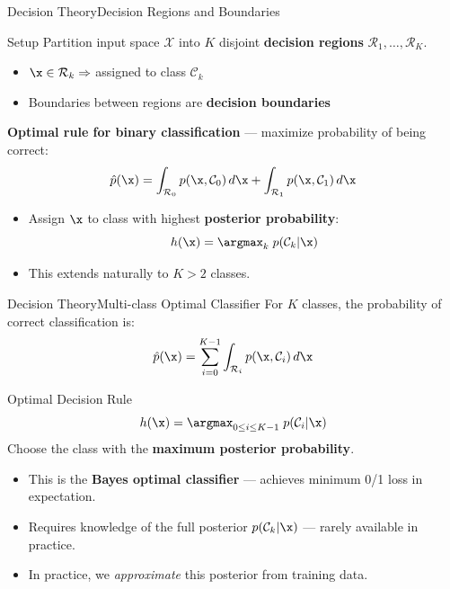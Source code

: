 \begin{frame}{Decision Theory}{Decision Regions and Boundaries}
  \begin{block}{Setup}
    Partition input space $\mathcal{X}$ into $K$ disjoint \textbf{decision regions} $\mathcal{R}_1, \ldots, \mathcal{R}_K$.
    \begin{itemize}
      \item $\x \in \mathcal{R}_k \Rightarrow$ assigned to class $\mathcal{C}_k$
      \item Boundaries between regions are \textbf{decision boundaries}
    \end{itemize}
  \end{block}

  \textbf{Optimal rule for binary classification} — maximize probability of being correct:
  \[
    \hat{p}(\x) = \int_{\mathcal{R}_0} p(\x,\mathcal{C}_0)\,d\x + \int_{\mathcal{R}_1} p(\x,\mathcal{C}_1)\,d\x
  \]
  
  \begin{itemize}
    \item Assign $\x$ to class with highest \textbf{posterior probability}:
    \[
      h(\x) = \argmax_{k} \; p(\mathcal{C}_k|\x)
    \]
    \item This extends naturally to $K > 2$ classes.
  \end{itemize}
\end{frame}

\begin{frame}{Decision Theory}{Multi-class Optimal Classifier}
  For $K$ classes, the probability of correct classification is:
  \[
    \hat{p}(\x) = \sum_{i=0}^{K-1} \int_{\mathcal{R}_i} p(\x, \mathcal{C}_i)\,d\x
  \]

  \begin{block}{Optimal Decision Rule}
    \[
      h(\x) = \argmax_{0 \le i \le K-1} \; p(\mathcal{C}_i|\x)
    \]
    Choose the class with the \textbf{maximum posterior probability}.
  \end{block}

  \begin{itemize}
    \item This is the \textbf{Bayes optimal classifier} — achieves minimum 0/1 loss in expectation.
    \item Requires knowledge of the full posterior $p(\mathcal{C}_k|\x)$ — rarely available in practice.
    \item In practice, we \emph{approximate} this posterior from training data.
  \end{itemize}
\end{frame}

